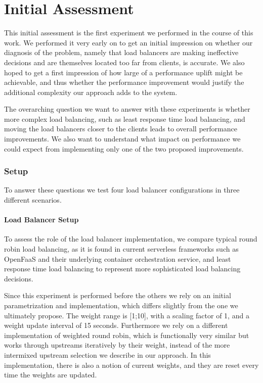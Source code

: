 \section{Initial Assessment}
This initial assessment is the first experiment we performed in the course of this work.
We performed it very early on to get an initial impression on whether our diagnosis of the problem, namely that load balancers are making ineffective decisions and are themselves located too far from clients, is accurate.
We also hoped to get a first impression of how large of a performance uplift might be achievable, and thus whether the performance improvement would justify the additional complexity our approach adds to the system.

The overarching question we want to answer with these experiments is whether more complex load balancing, such as least response time load balancing, and moving the load balancers closer to the clients leads to overall performance improvements.
We also want to understand what impact on performance we could expect from implementing only one of the two proposed improvements.

\subsubsection{Setup}
To answer these questions we test four load balancer configurations in three different scenarios.
\paragraph{Load Balancer Setup}
To assess the role of the load balancer implementation, we compare typical round robin load balancing, as it is found in current serverless frameworks such as OpenFaaS\cite{openfaas} and their underlying container orchestration service\cite{kubernetes}, and least response time load balancing to represent more sophisticated load balancing decisions.

Since this experiment is performed before the others we rely on an initial parametrization and implementation, which differs slightly from the one we ultimately propose.
The weight range is [1;10], with a scaling factor of 1, and a weight update interval of 15 seconds.
Furthermore we rely on a different implementation of weighted round robin\cite{wrr-kblinux}, which is functionally very similar but works through upstreams iteratively by their weight, instead of the more intermixed upstream selection we describe in our approach.
In this implementation, there is also a notion of current weights\cite{wrr-kblinux}, and they are reset every time the weights are updated.
